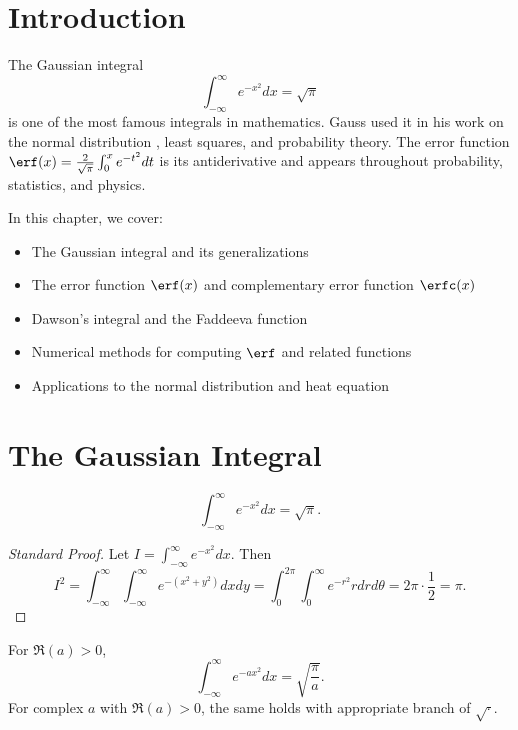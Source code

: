 \section{Introduction}

The Gaussian integral 
\[
\int_{-\infty}^{\infty} e^{-x^2} dx = \sqrt{\pi}
\]
is one of the most famous integrals in mathematics. Gauss used it in his work on the normal distribution , least squares, and probability theory. The error function  $\erf(x) = \frac{2}{\sqrt{\pi}} \int_0^x e^{-t^2} dt$ is its antiderivative and appears throughout probability, statistics, and physics.

In this chapter, we cover:
\begin{itemize}
    \item The Gaussian integral and its generalizations
    \item The error function $\erf(x)$ and complementary error function  $\erfc(x)$
    \item Dawson's integral  and the Faddeeva function 
    \item Numerical methods for computing $\erf$ and related functions
    \item Applications to the normal distribution and heat equation 
\end{itemize}

\section{The Gaussian Integral}

\begin{theorem}
\[
\int_{-\infty}^{\infty} e^{-x^2} dx = \sqrt{\pi}.
\]
\end{theorem}

\begin{proof}[Standard Proof]
Let $I = \int_{-\infty}^{\infty} e^{-x^2} dx$. Then
\[
I^2 = \int_{-\infty}^{\infty} \int_{-\infty}^{\infty} e^{-(x^2+y^2)} dx dy = \int_0^{2\pi} \int_0^{\infty} e^{-r^2} r dr d\theta = 2\pi \cdot \frac{1}{2} = \pi.
\]
\end{proof}

\begin{theorem}
For $\Re(a) > 0$,
\[
\int_{-\infty}^{\infty} e^{-a x^2} dx = \sqrt{\frac{\pi}{a}}.
\]
For complex $a$ with $\Re(a) > 0$, the same holds with appropriate branch of $\sqrt{\cdot}$.
\end{theorem}

